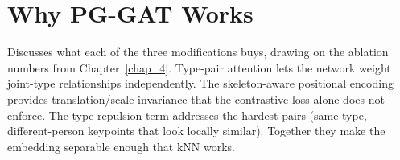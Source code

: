 \section{Why PG-GAT Works}
\label{sec_disc_pggat_why}

Discusses what each of the three modifications buys, drawing on the ablation numbers from Chapter~\ref{chap_4}. Type-pair attention lets the network weight joint-type relationships independently. The skeleton-aware positional encoding provides translation/scale invariance that the contrastive loss alone does not enforce. The type-repulsion term addresses the hardest pairs (same-type, different-person keypoints that look locally similar). Together they make the embedding separable enough that kNN works.
